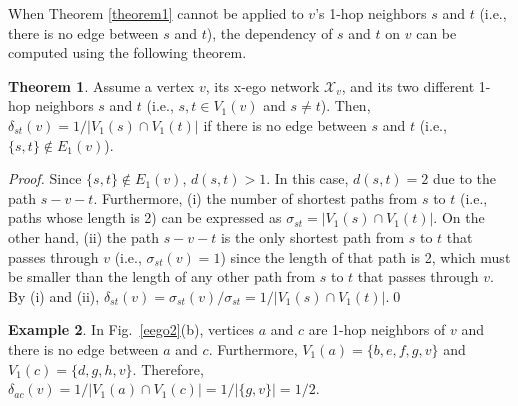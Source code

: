\documentclass[journal]{IEEEtran}
\newcommand{\D}[3]{\delta_{{#1}{#2}}({#3})}
\newcommand{\V}[2]{V_{#2}({#1})}
\newcommand{\LV}[2]{V_{\le #2}({#1})}
\newcommand{\E}[2]{E_{#2}({#1})}
\newcommand{\XN}[1]{\mathcal{X}_{{#1}}}
\theoremstyle{definition}
\newtheorem{theorem}{Theorem}[section]
\newtheorem{example}[theorem]{Example}
\begin{document}
When Theorem \ref{theorem1} cannot be applied to $v$'s 1-hop neighbors $s$ and $t$ (i.e., there is no edge between $s$ and $t$), the dependency of $s$ and $t$ on $v$ can be computed using the following theorem.

\begin{theorem}
\label{theorem2} 
Assume a vertex $v$, its x-ego network $\XN{v}$, and its two different 1-hop neighbors $s$ and $t$ (i.e., $s, t \in \V{v}{1}$ and $s \ne t$).
Then, $\D{s}{t}{v} = {1}/{|\V{s}{1} \cap \V{t}{1}|}$ if there is no edge between $s$ and $t$ (i.e., $\{s, t\} \notin \E{v}{1}$).
\begin{proof}
Since $\{s, t\} \notin \E{v}{1}$, $d(s, t) > 1$.
In this case, $d(s, t) = 2$ due to the path $s - v - t$.
Furthermore, (i) the number of shortest paths from $s$ to $t$ (i.e., paths whose length is 2) can be expressed as $\sigma_{st} = |\V{s}{1} \cap \V{t}{1}|$.
On the other hand, (ii) the path $s-v-t$ is the only shortest path from $s$ to $t$ that passes through $v$ (i.e., $\sigma_{st}(v) = 1$) since the length of that path is 2, which must be smaller than the length of any other path from $s$ to $t$ that passes through $v$.
By (i) and (ii), $\D{s}{t}{v} = \sigma_{st}(v)/\sigma_{st} = {1}/{|\V{s}{1} \cap \V{t}{1}|}$.\hfill\qed
\end{proof}
\end{theorem}


\begin{example}
\label{example2} 
In Fig.~\ref{eego2}(b), vertices $a$ and $c$ are 1-hop neighbors of $v$ and there is no edge between $a$ and $c$.
Furthermore, $\V{a}{1} = \lbrace b, e, f, g, v\rbrace$ and $\V{c}{1} = \lbrace d, g, h, v\rbrace$.
Therefore, $\D{a}{c}{v}=1/|\V{a}{1} \cap \V{c}{1}|=1/|\{g, v \}|=1/2$.

\end{example}
\end{document}
